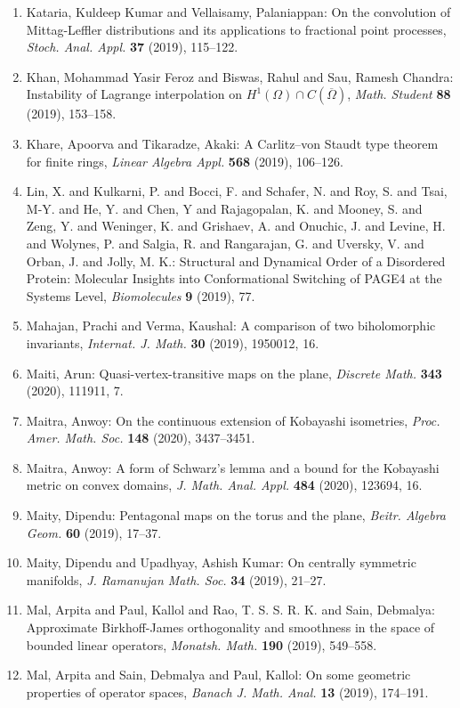 \begin{enumerate}
\item Kataria, Kuldeep Kumar and Vellaisamy, Palaniappan: On the convolution of {M}ittag-{L}effler distributions and its
applications to fractional point processes, \emph{Stoch. Anal. Appl.} {\bf 37} (2019), 115--122.
\item Khan, Mohammad Yasir Feroz and Biswas, Rahul and Sau, Ramesh
Chandra: Instability of {L}agrange interpolation on {$H^1(\Omega)\cap
C(\overline\Omega)$}, \emph{Math. Student} {\bf 88} (2019), 153--158.
\item Khare, Apoorva and Tikaradze, Akaki: A {C}arlitz--von {S}taudt type theorem for finite rings, \emph{Linear Algebra Appl.} {\bf 568} (2019), 106--126.
\item Lin, X. and Kulkarni, P. and Bocci, F. and Schafer, N. and Roy, S. and Tsai, M-Y. and He, Y. and Chen, Y and Rajagopalan, K. and Mooney, S. and Zeng, Y. and Weninger, K. and Grishaev, A. and Onuchic, J. and Levine, H. and Wolynes, P. and Salgia, R. and Rangarajan, G. and Uversky, V. and Orban, J. and Jolly, M. K.: Structural and Dynamical Order of a Disordered Protein: Molecular Insights into Conformational Switching of PAGE4 at the Systems Level, \emph{Biomolecules} {\bf 9} (2019), 77.
\item Mahajan, Prachi and Verma, Kaushal: A comparison of two biholomorphic invariants, \emph{Internat. J. Math.} {\bf 30} (2019), 1950012, 16.
\item Maiti, Arun: Quasi-vertex-transitive maps on the plane, \emph{Discrete Math.} {\bf 343} (2020), 111911, 7.
\item Maitra, Anwoy: On the continuous extension of {K}obayashi isometries, \emph{Proc. Amer. Math. Soc.} {\bf 148} (2020), 3437--3451.
\item Maitra, Anwoy: A form of {S}chwarz's lemma and a bound for the {K}obayashi
metric on convex domains, \emph{J. Math. Anal. Appl.} {\bf 484} (2020), 123694, 16.
\item Maity, Dipendu: Pentagonal maps on the torus and the plane, \emph{Beitr. Algebra Geom.} {\bf 60} (2019), 17--37.
\item Maity, Dipendu and Upadhyay, Ashish Kumar: On centrally symmetric manifolds, \emph{J. Ramanujan Math. Soc.} {\bf 34} (2019), 21--27.
\item Mal, Arpita and Paul, Kallol and Rao, T. S. S. R. K. and Sain,
Debmalya: Approximate {B}irkhoff-{J}ames orthogonality and smoothness in
the space of bounded linear operators, \emph{Monatsh. Math.} {\bf 190} (2019), 549--558.
\item Mal, Arpita and Sain, Debmalya and Paul, Kallol: On some geometric properties of operator spaces, \emph{Banach J. Math. Anal.} {\bf 13} (2019), 174--191.

\end{enumerate}
